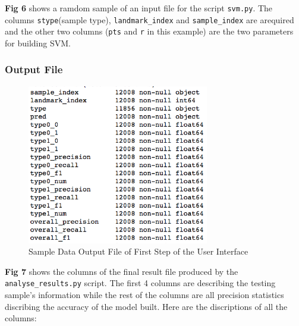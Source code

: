 \documentclass[10pt,letterpaper]{article}
\begin{document}
\textbf{Fig 6} shows a ramdom sample of an input file for the script
\texttt{svm.py}. The columns \texttt{stype}(sample type),
\texttt{landmark\_index} and \texttt{sample\_index} are arequired and
the other two columns (\texttt{pts} and \texttt{r} in this example) are
the two parameters for building SVM.

\subsubsection{Output File}\label{output-file}

\begin{figure}[h]

{\centering \includegraphics[width=300px]{figures/Figure5} 

}

\caption{Sample Data Output File of First Step of the User Interface}\label{fig:outputdata2}
\end{figure}

\textbf{Fig 7} shows the columns of the final result file produced by
the \texttt{analyse\_results.py} script. The first 4 columns are
describing the testing sample's information while the rest of the
columns are all precision statistics discribing the accuracy of the
model built. Here are the discriptions of all the columns:
\end{document}
